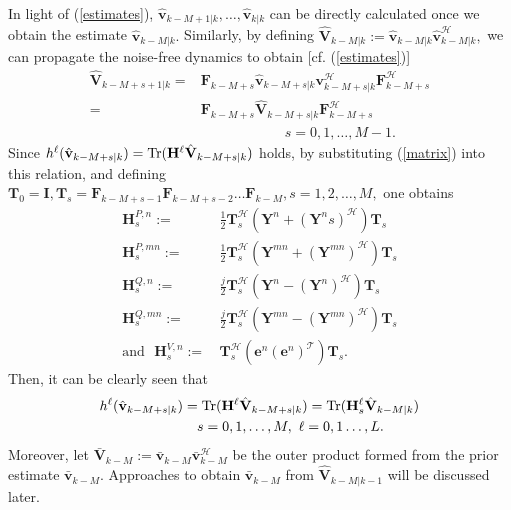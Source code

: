 \documentclass[conference]{IEEEtran}
\def\ccalH{{\ensuremath{\mathcal H}}}
\def\ccalT{{\ensuremath{\mathcal T}}}
\def\bbF{{\ensuremath{\mathbf F}}}
\def\bbH{{\ensuremath{\mathbf H}}}
\def\bbI{{\ensuremath{\mathbf I}}}
\def\bbV{{\ensuremath{\mathbf V}}}
\def\bbT{{\ensuremath{\mathbf T}}}
\def\bbY{{\ensuremath{\mathbf Y}}}
\def\bbe{{\ensuremath{\mathbf e}}}
\def\bbv{{\ensuremath{\mathbf v}}}
\begin{document}
In light of (\ref{estimates}), $\hat\bbv_{k-M+1|k},\ldots,\hat\bbv_{k|k}$ can be directly calculated once we obtain the estimate $\hat\bbv_{k-M|k}.$ Similarly, by defining ${\hat\bbV_{k-M|k}}:={\hat\bbv_{k-M|k}\hat\bbv_{k-M|k}^{\ccalH}},$ we can propagate the noise-free dynamics to obtain [cf. (\ref{estimates})]
\begin{align}
\hat\bbV_{k-M+s+1|k}=&\bbF_{k-M+s}\hat\bbv_{k-M+s|k}\bbv^\ccalH_{k-M+s|k}\bbF_{k-M+s}^\ccalH\nonumber\\
=&\bbF_{k-M+s}{\hat\bbV_{k-M+s|k}}\bbF_{k-M+s}^\ccalH\nonumber\\
&\qquad\qquad\quad\quad s=0,1,\ldots,M-1.\label{matrix}
\end{align}
Since $h^\ell(\hat{\bbv}_{k-M+s|k})={\rm{Tr}}(\bbH^\ell\hat{\bbV}_{k-M+s|k})$ holds, by substituting (\ref{matrix}) into this relation, and defining $\bbT_0=\bbI, \bbT_s=\bbF_{k-M+s-1}\bbF_{k-M+s-2}\ldots\bbF_{k-M},s=1,2,\ldots,M,$ one obtains
\begin{subequations}
\begin{align}
\bbH_{s}^{P,n}:=\,&\frac{1}{2}\bbT_s^\ccalH\left(\bbY^n+(\bbY^ns)^{\ccalH}\right)\bbT_s\label{hspn}\\
\bbH_{s}^{P,mn}:=\,&\frac{1}{2}\bbT_s^\ccalH\left(\bbY^{mn}+(\bbY^{mn})^{\ccalH}\right)\bbT_s\\
\bbH_{s}^{Q,n}:=\,&\frac{j}{2}\bbT_s^\ccalH\left(\bbY^n-(\bbY^n)^{\ccalH}\right)\bbT_s\label{hsqn}\\
\bbH_{s}^{Q,mn}:=\,&\frac{j}{2}\bbT_s^\ccalH\left(\bbY^{mn}-(\bbY^{mn})^{\ccalH}\right)\bbT_s\\
{\text{and~~}}\bbH_{s}^{V,n}:=\,&\bbT_s^\ccalH(\bbe^n(\bbe^n)^\ccalT)\bbT_s\label{hsvn}.
\end{align}
\end{subequations}
Then, it can be clearly seen that
\begin{align}
h^\ell(\hat\bbv_{k-M+s|k})&={\rm{Tr}}(\bbH^\ell\hat\bbV_{k-M+s|k})={\rm{Tr}}(\bbH_s^\ell\hat\bbV_{k-M|k})\nonumber\\ &\quad s=0,1,\ldots,M,\,\, \ell=0,1\ldots,L.\label{zi}
\end{align}
Moreover, let $\bar\bbV_{k-M}:=\bar\bbv_{k-M}\bar\bbv_{k-M}^\ccalH$ be the outer product formed from the prior estimate $\bar{\bbv}_{k-M}.$ Approaches to obtain $\bar{\bbv}_{k-M}$ from $\hat{\bbV}_{k-M|k-1}$ will be discussed later.
\end{document}

